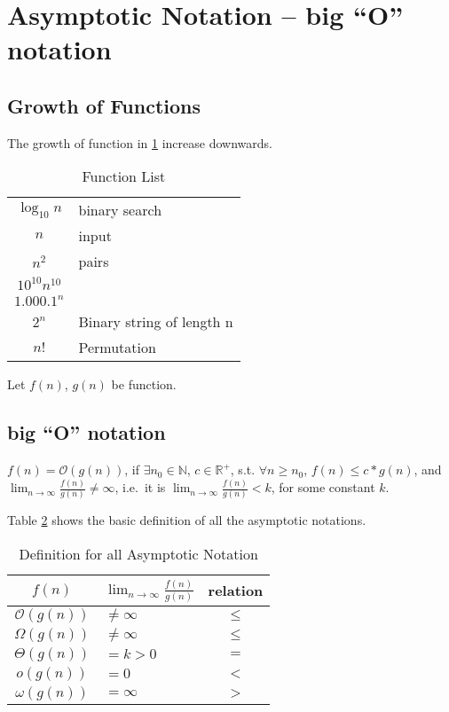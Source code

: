 
\section{Asymptotic Notation -- big ``O'' notation}

\subsection{Growth of Functions}

The growth of function in \cref{function_list} increase downwards.
\begin{table}[H]
\centering
\caption{Function List}\label{function_list}
\begin{tabular}{c|l}
$\log_{10} n$ & binary search \\
$n$ & input \\
$n^2$ & pairs \\
$10^{10}n^{10}$ & \\
$1.000.1^n$ & \\
$2^n$ & Binary string of length n \\
$n!$ & Permutation \\
\end{tabular}
\end{table}
Let $f(n)$, $g(n)$ be function.

\subsection{big ``O'' notation}
\begin{definition}

$f(n) = \mathcal{O}(g(n))$, if $\exists n_0 \in \mathbb{N}$,
$c \in \mathbb{R}^+$, s.t. $\forall n \geq n_0$, $f(n) \leq c * g(n)$,
and $\lim_{n \rightarrow \infty} \frac{f(n)}{g(n)} \ne \infty$, i.e.\ it is $\lim_{n \rightarrow \infty} \frac{f(n)}{g(n)} < k$, for some constant $k$.
\end{definition}

Table \ref{def_asymptotic_notation} shows the basic definition of all the asymptotic notations.
\begin{table}[H]
\centering
\caption{Definition for all Asymptotic Notation}\label{def_asymptotic_notation}
\begin{tabular}{c|l|c}
\hline
$f(n)$ & $\lim_{n \rightarrow \infty} \frac{f(n)}{g(n)}$ & relation \\
\hline
\hline
$\mathcal{O}(g(n))$ & $\neq \infty$ & $\leq$ \\
$\Omega(g(n))$  & $\neq \infty$ & $\leq$  \\
$\Theta(g(n))$  & $= k > 0$ & $=$  \\
$o(g(n))$  & $= 0$ & $<$  \\
$\omega(g(n))$  & $= \infty$ & $>$  \\
\end{tabular}
\end{table}

